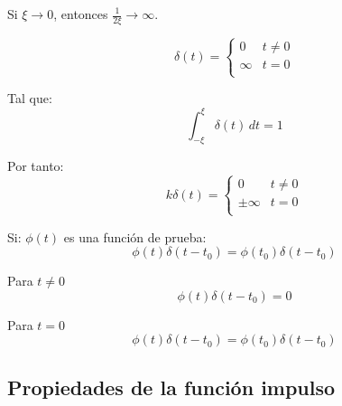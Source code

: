 Si $\xi\to0$, entonces $\frac{1}{2\xi}\to\infty$.
\begin{figure}[H]
    \centering
    
\end{figure}
\begin{equation*}
    \delta(t)=\begin{cases}
        0      & t\neq0\\
        \infty & t=0\\
    \end{cases}
\end{equation*}

Tal que:
\begin{equation*}
    \int_{-\xi}^{\xi} \delta(t)\,dt=1
\end{equation*}

Por tanto:
\begin{equation}
    k\delta(t)=\begin{cases}
        0         & t\neq0\\
        \pm\infty & t=0\\
    \end{cases}
\end{equation}
\begin{figure}[H]
    \centering
    \begin{minipage}{.4\textwidth}
        \centering
        
    \end{minipage}
    \begin{minipage}{.4\textwidth}
        \centering
        
    \end{minipage}
\end{figure}

Si: $\phi(t)$ es una función de prueba:
\begin{equation}
    \phi(t)\delta(t-t_0)=\phi(t_0)\delta(t-t_0)
\end{equation}
\begin{figure}[H]
    \centering
    
\end{figure}

Para $t\neq0$
\begin{equation*}
    \phi(t)\delta(t-t_0)=0
\end{equation*}

Para $t=0$
\begin{equation*}
    \phi(t)\delta(t-t_0)=\phi(t_0)\delta(t-t_0)
\end{equation*}

\subsection{Propiedades de la función impulso}
